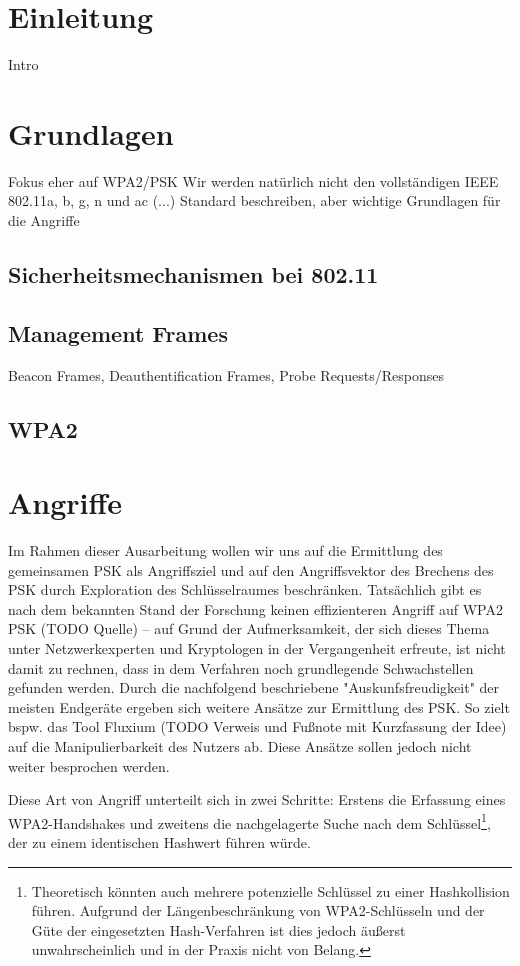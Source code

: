 \documentclass[12pt]{article}
\begin{document}
\tableofcontents

\section{Einleitung}
Intro

\section{Grundlagen}
Fokus eher auf WPA2/PSK
Wir werden natürlich nicht den vollständigen IEEE 802.11a, b, g, n und ac (...) Standard beschreiben, aber wichtige Grundlagen für die Angriffe
\subsection{Sicherheitsmechanismen bei 802.11}

\subsection{Management Frames}
Beacon Frames, Deauthentification Frames, Probe Requests/Responses

\subsection{WPA2}

\section{Angriffe}
Im Rahmen dieser Ausarbeitung wollen wir uns auf die Ermittlung des gemeinsamen PSK als Angriffsziel und auf den Angriffsvektor des Brechens des PSK durch Exploration des Schlüsselraumes beschränken. Tatsächlich gibt es nach dem bekannten Stand der Forschung keinen effizienteren Angriff auf WPA2 PSK (TODO Quelle) -- auf Grund der Aufmerksamkeit, der sich dieses Thema unter Netzwerkexperten und Kryptologen in der Vergangenheit erfreute, ist nicht damit zu rechnen, dass in dem Verfahren noch grundlegende Schwachstellen gefunden werden. Durch die nachfolgend beschriebene "Auskunfsfreudigkeit" der meisten Endgeräte ergeben sich weitere Ansätze zur Ermittlung des PSK. So zielt bspw. das Tool Fluxium (TODO Verweis und Fußnote mit Kurzfassung der Idee) auf die Manipulierbarkeit des Nutzers ab. Diese Ansätze sollen jedoch nicht weiter besprochen werden.

Diese Art von Angriff unterteilt sich in zwei Schritte: Erstens die Erfassung eines WPA2-Handshakes und zweitens die nachgelagerte Suche nach dem Schlüssel\footnote{Theoretisch könnten auch mehrere potenzielle Schlüssel zu einer Hashkollision führen. Aufgrund der Längenbeschränkung von WPA2-Schlüsseln und der Güte der eingesetzten Hash-Verfahren ist dies jedoch äußerst unwahrscheinlich und in der Praxis nicht von Belang.}, der zu einem identischen Hashwert führen würde.
\end{document}
